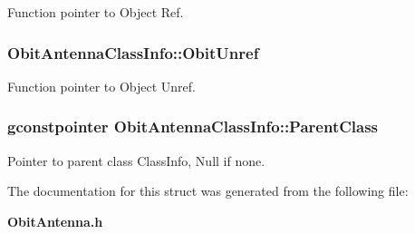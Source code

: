 Function pointer to Object Ref. 

\subsubsection{ {\bf Obit\-Antenna\-Class\-Info::Obit\-Unref}}\label{structObitAntennaClassInfo_o11}


Function pointer to Object Unref. 

\subsubsection{\setlength{\rightskip}{0pt plus 5cm}gconstpointer {\bf Obit\-Antenna\-Class\-Info::Parent\-Class}}\label{structObitAntennaClassInfo_o3}


Pointer to parent class Class\-Info, Null if none. 



The documentation for this struct was generated from the following file:\begin{CompactItemize}
\item 
{\bf Obit\-Antenna.h}\end{CompactItemize}
